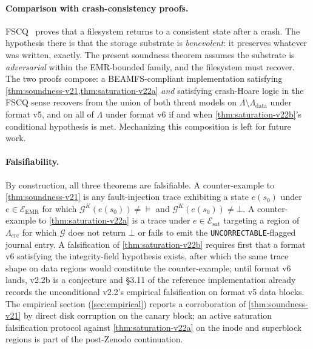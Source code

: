 \paragraph{Comparison with crash-consistency proofs.}
FSCQ~\cite{chen2015fscq} proves that a filesystem returns to a
consistent state after a crash. The hypothesis there is that the
storage substrate is \emph{benevolent}: it preserves whatever was
written, exactly. The present soundness theorem assumes the
substrate is \emph{adversarial} within the EMR-bounded family,
and the filesystem must recover. The two proofs compose: a
BEAMFS-compliant implementation satisfying
\cref{thm:soundness-v21,thm:saturation-v22a} \emph{and} satisfying
crash-Hoare logic in the FSCQ sense recovers from the union of
both threat models on \(\Lambda \setminus \Lambda_{\mathrm{data}}\)
under format v5, and on all of \(\Lambda\) under format v6 if and
when \cref{thm:saturation-v22b}'s conditional hypothesis is met. Mechanizing this composition is left for
future work.

\paragraph{Falsifiability.}
By construction, all three theorems are falsifiable. A
counter-example to \cref{thm:soundness-v21} is any
fault-injection trace exhibiting a state \(e(s_0)\) under
\(e \in \mathcal{E}_{\mathrm{EMR}}\) for which
\(\mathcal{G}^K(e(s_0)) \neq \models\) and
\(\mathcal{G}^K(e(s_0)) \neq \bot\). A counter-example to
\cref{thm:saturation-v22a} is a trace under
\(e \in \mathcal{E}_{\mathrm{sat}}\) targeting a region of
\(\Lambda_{\mathrm{crc}}\) for which \(\mathcal{G}\) does not
return \(\bot\) or fails to emit the
\texttt{UNCORRECTABLE}-flagged journal entry. A falsification of
\cref{thm:saturation-v22b} requires first that a format v6
satisfying the integrity-field hypothesis exists, after which the
same trace shape on data regions would constitute the
counter-example; until format v6 lands, v2.2b is a conjecture and
\S3.11 of the reference implementation already records the
unconditional v2.2's empirical falsification on format v5 data
blocks. The empirical section (\cref{sec:empirical}) reports a
corroboration of \cref{thm:soundness-v21} by direct disk
corruption on the canary block; an active saturation falsification
protocol against \cref{thm:saturation-v22a} on the inode and
superblock regions is part of the post-Zenodo continuation.
